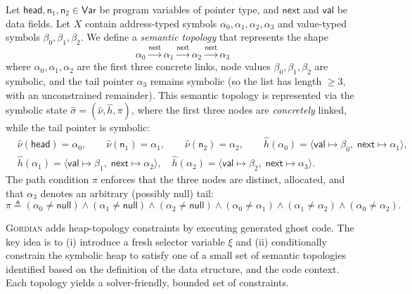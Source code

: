 \documentclass[acmsmall]{acmart}
\newcommand{\projName}{\textsc{Gordian}\xspace}
\theoremstyle{definition}
\begin{document}
\begin{example}\label{example:topology}
Let $\mathsf{head},\mathsf{n}_1,\mathsf{n}_2 \in \mathsf{Var}$ be program variables of pointer type, and $\mathsf{next}$ and $\mathsf{val}$ be data fields. Let $X$ contain address-typed symbols $\alpha_0,\alpha_1,\alpha_2,\alpha_3$ and value-typed symbols $\beta_0,\beta_1,\beta_2$. We define a \emph{semantic topology} that represents the shape
\[
\alpha_0 \xrightarrow{\mathsf{next}} \alpha_1 \xrightarrow{\mathsf{next}} \alpha_2 \xrightarrow{\mathsf{next}} \alpha_3
\]
where $\alpha_0,\alpha_1,\alpha_2$ are the first three concrete links, node values $\beta_0,\beta_1,\beta_2$ are symbolic, and the tail pointer $\alpha_3$ remains symbolic (so the list has length $\ge 3$, with an unconstrained remainder). This semantic topology is represented via the symbolic state $\hat\sigma=(\hat\nu,\hat h,\pi)$, where the first three nodes are \emph{concretely} linked, while the tail pointer is symbolic:
\begin{align*}
&\hat\nu(\mathsf{head}) = \alpha_0,\qquad
\hat\nu(\mathsf{n}_1) = \alpha_1,\qquad
\hat\nu(\mathsf{n}_2) = \alpha_2, \qquad \hat h(\alpha_0) = \langle \mathsf{val} \mapsto \beta_0,\;\mathsf{next} \mapsto \alpha_1\rangle,\\
&\hat h(\alpha_1) = \langle \mathsf{val} \mapsto \beta_1,\;\mathsf{next} \mapsto \alpha_2\rangle,\quad
\hat h(\alpha_2) = \langle \mathsf{val} \mapsto \beta_2,\;\mathsf{next} \mapsto \alpha_3\rangle.
\end{align*}
The path condition $\pi$ enforces that the three nodes are distinct, allocated, and that $\alpha_3$ denotes an arbitrary (possibly null) tail:
\[
\pi \triangleq (\alpha_0 \neq \mathsf{null}) \wedge (\alpha_1 \neq \mathsf{null}) \wedge (\alpha_2 \neq \mathsf{null})
\wedge (\alpha_0 \neq \alpha_1) \wedge (\alpha_1 \neq \alpha_2) \wedge (\alpha_0 \neq \alpha_2).
\]
\end{example}

\projName adds heap-topology constraints by executing generated ghost code. The key idea is to (i) introduce
a fresh selector variable $\xi$ and (ii) conditionally constrain the symbolic
heap to satisfy one of a small set of semantic topologies identified based on the definition of the data structure, and the code context. Each topology yields a solver-friendly, bounded set of constraints.
\end{document}
